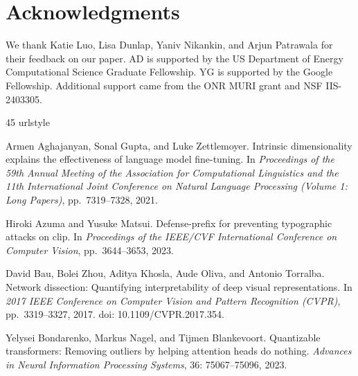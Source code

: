 \documentclass{article}
\begin{document}
\section{Acknowledgments}
\label{sec:awknowledgements}

We thank Katie Luo, Lisa Dunlap, Yaniv Nikankin, and Arjun Patrawala for their feedback on our paper. AD is supported by the US Department of Energy Computational Science Graduate Fellowship. YG is supported by the Google Fellowship. Additional support came from the ONR MURI grant and NSF IIS-2403305.


\begin{thebibliography}{45}
\providecommand{\natexlab}[1]{#1}
\providecommand{\url}[1]{\texttt{#1}}
\expandafter\ifx\csname urlstyle\endcsname\relax
  \providecommand{\doi}[1]{doi: #1}\else
  \providecommand{\doi}{doi: \begingroup \urlstyle{rm}\Url}\fi

Armen Aghajanyan, Sonal Gupta, and Luke Zettlemoyer.
\newblock Intrinsic dimensionality explains the effectiveness of language model fine-tuning.
\newblock In \emph{Proceedings of the 59th Annual Meeting of the Association for Computational Linguistics and the 11th International Joint Conference on Natural Language Processing (Volume 1: Long Papers)}, pp.\  7319--7328, 2021.

Hiroki Azuma and Yusuke Matsui.
\newblock Defense-prefix for preventing typographic attacks on clip.
\newblock In \emph{Proceedings of the IEEE/CVF International Conference on Computer Vision}, pp.\  3644--3653, 2023.

David Bau, Bolei Zhou, Aditya Khosla, Aude Oliva, and Antonio Torralba.
\newblock Network dissection: Quantifying interpretability of deep visual representations.
\newblock In \emph{2017 IEEE Conference on Computer Vision and Pattern Recognition (CVPR)}, pp.\  3319--3327, 2017.
\newblock \doi{10.1109/CVPR.2017.354}.

Yelysei Bondarenko, Markus Nagel, and Tijmen Blankevoort.
\newblock Quantizable transformers: Removing outliers by helping attention heads do nothing.
\newblock \emph{Advances in Neural Information Processing Systems}, 36: 75067--75096, 2023.


\end{thebibliography}
\end{document}

